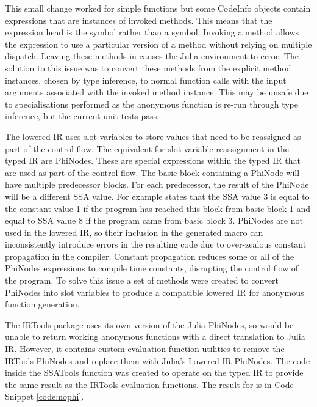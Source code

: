 This small change worked for simple functions but some CodeInfo objects contain expressions that are instances of invoked methods. This means that the expression head is the  symbol rather than a  symbol. Invoking a method allows the expression to use a particular version of a method without relying on multiple dispatch. Leaving these methods in causes the Julia environment to error. The solution to this issue was to convert these methods from the explicit method instances, chosen by type inference, to normal function calls with the input arguments associated with the invoked method instance. This may be unsafe due to specialisations performed as the anonymous function is re-run through type inference, but the current unit tests pass.

The lowered IR uses slot variables to store values that need to be reassigned as part of the control flow. The equivalent for slot variable reassignment in the typed IR are PhiNodes. These are special expressions within the typed IR that are used as part of the control flow. The basic block containing a PhiNode will have multiple predecessor blocks. For each predecessor, the result of the PhiNode will be a different SSA value. For example  states that the SSA value 3 is equal to the constant value 1 if the program has reached this block from basic block 1 and equal to SSA value 8 if the program came from basic block 3. PhiNodes are not used in the lowered IR, so their inclusion in the generated macro can inconsistently introduce errors in the resulting code due to over-zealous constant propagation in the compiler. Constant propagation reduces some or all of the PhiNodes expressions to compile time constants, disrupting the control flow of the program. To solve this issue a set of methods were created to convert PhiNodes into slot variables to produce a compatible lowered IR for anonymous function generation.

The IRTools package uses its own version of the Julia PhiNodes, so would be unable to return working anonymous functions with a direct translation to Julia IR. However, it contains custom evaluation function utilities \cite{julia_irtools_utils} to remove the IRTools PhiNodes and replace them with Julia's Lowered IR PhiNodes. The code inside the SSATools  function was created to operate on the typed IR to provide the same result as the IRTools evaluation functions. The result for  is in Code Snippet \ref{code:nophi}.

